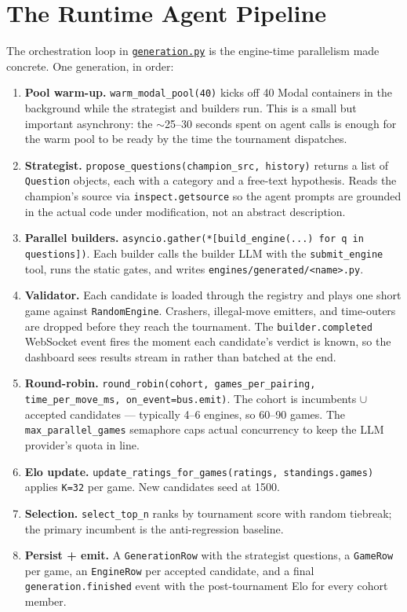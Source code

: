\documentclass[11pt]{article}
\begin{document}
\section{The Runtime Agent Pipeline}
\label{sec:pipeline}

The orchestration loop in
\href{run:../backend/darwin/orchestration/generation.py}{\texttt{generation.py}}
is the engine-time parallelism made concrete. One generation, in
order:

\begin{enumerate}[leftmargin=*]
\item \textbf{Pool warm-up.} \texttt{warm\_modal\_pool(40)} kicks off
40 Modal containers in the background while the strategist and
builders run. This is a small but important asynchrony: the
\(\sim\)25--30 seconds spent on agent calls is enough for the warm
pool to be ready by the time the tournament dispatches.
\item \textbf{Strategist.}
\texttt{propose\_questions(champion\_src, history)} returns a list of
\texttt{Question} objects, each with a category and a free-text
hypothesis. Reads the champion's source via \texttt{inspect.getsource}
so the agent prompts are grounded in the actual code under
modification, not an abstract description.
\item \textbf{Parallel builders.}
\texttt{asyncio.gather(*[build\_engine(...) for q in questions])}.
Each builder calls the builder LLM with the
\texttt{submit\_engine} tool, runs the static gates, and writes
\texttt{engines/generated/<name>.py}.
\item \textbf{Validator.} Each candidate is loaded through the
registry and plays one short game against \texttt{RandomEngine}.
Crashers, illegal-move emitters, and time-outers are dropped before
they reach the tournament. The
\texttt{builder.completed} WebSocket event fires the moment each
candidate's verdict is known, so the dashboard sees results stream in
rather than batched at the end.
\item \textbf{Round-robin.}
\texttt{round\_robin(cohort, games\_per\_pairing, time\_per\_move\_ms,
on\_event=bus.emit)}. The cohort is incumbents \(\cup\) accepted
candidates --- typically 4--6 engines, so 60--90 games. The
\texttt{max\_parallel\_games} semaphore caps actual concurrency to
keep the LLM provider's quota in line.
\item \textbf{Elo update.}
\texttt{update\_ratings\_for\_games(ratings, standings.games)} applies
\texttt{K=32} per game. New candidates seed at 1500.
\item \textbf{Selection.} \texttt{select\_top\_n} ranks by tournament
score with random tiebreak; the primary incumbent is the
anti-regression baseline.
\item \textbf{Persist + emit.} A \texttt{GenerationRow} with the
strategist questions, a \texttt{GameRow} per game, an
\texttt{EngineRow} per accepted candidate, and a final
\texttt{generation.finished} event with the post-tournament Elo for
every cohort member.
\end{enumerate}
\end{document}
